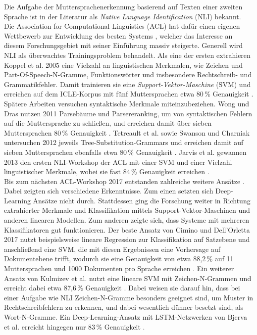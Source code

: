\documentclass[bachelor,german]{info1thesis}
\begin{document}
Die Aufgabe der Muttersprachenerkennung basierend auf Texten einer zweiten Sprache ist in der Literatur als \textit{Native Language Identification} (NLI) bekannt. Die Association for Computational Linguistics (ACL) hat dafür einen eigenen Wettbewerb zur Entwicklung des besten Systems \cite{Tetreault2013,Malmasi2017}, welcher das Interesse an diesem Forschungsgebiet mit seiner Einführung massiv steigerte. Generell wird NLI als überwachtes Trainingsproblem behandelt. Als eine der ersten extrahieren Koppel et al. 2005 eine Vielzahl an linguistischen Merkmalen, wie Zeichen und Part-Of-Speech-N-Gramme, Funktionswörter und insbesondere Rechtschreib- und Grammatikfehler. Damit trainieren sie eine \textit{Support-Vektor-Maschine} (SVM) und erreichen auf dem ICLE-Korpus mit fünf Muttersprachen etwa 80\,\% Genauigkeit \cite{Koppel2005}. \\
Spätere Arbeiten versuchen syntaktische Merkmale miteinzubeziehen. Wong und Dras nutzen 2011 Parsebäume und Parsereranking, um von syntaktischen Fehlern auf die Muttersprache zu schließen, und erreichen damit über sieben Muttersprachen 80\,\% Genauigkeit \cite{Wong2011}. Tetreault et al. sowie Swanson und Charniak untersuchen 2012 jeweils Tree-Substitution-Grammars und erreichen damit auf sieben Muttersprachen ebenfalls etwa 80\,\% Genauigkeit \cite{Tetreault2012,Swanson2012}. Jarvis et al. gewannen 2013 den ersten NLI-Workshop der ACL mit einer SVM und einer Vielzahl linguistischer Merkmale, wobei sie fast 84\,\% Genauigkeit erreichen \cite{Jarvis2013}. \\
Bis zum nächsten ACL-Workshop 2017 entstanden zahlreiche weitere Ansätze \cite{Malmasi2017}. Dabei zeigten sich verschiedene Erkenntnisse. Zum einen setzten sich Deep-Learning Ansätze nicht durch. Stattdessen ging die Forschung weiter in Richtung extrahierter Merkmale und Klassifikation mittels Support-Vektor-Maschinen und anderen linearen Modellen. Zum anderen zeigte sich, dass Systeme mit mehreren Klassifikatoren gut funktionieren. Der beste Ansatz von Cimino und Dell'Orletta 2017 nutzt beispielsweise lineare Regression zur Klassifikation auf Satzebene und anschließend eine SVM, die mit diesen Ergebnissen eine Vorhersage auf Dokumentebene trifft, wodurch sie eine Genauigkeit von etwa 88,2\,\% auf 11 Muttersprachen und 1000 Dokumenten pro Sprache erreichen \cite{Cimino2017}. Ein weiterer Ansatz von Kulmizev et al. nutzt eine lineare SVM mit Zeichen-N-Grammen und erreicht dabei etwa 87,6\,\% Genauigkeit \cite{Kulmizev2017}. Dabei weisen sie darauf hin, dass bei einer Aufgabe wie NLI Zeichen-N-Gramme besonders geeignet sind, um Muster in Rechtschreibfehlern zu erkennen, und dabei wesentlich dünner besetzt sind, als Wort-N-Gramme. Ein Deep-Learning-Ansatz mit LSTM-Netzwerken von Bjerva et al. erreicht hingegen nur 83\,\% Genauigkeit \cite{Bjerva2017}.
\end{document}
